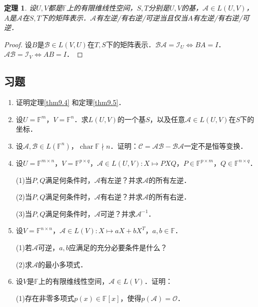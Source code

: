 \documentclass[a4paper,fontset=windows]{ctexbook}
\newtheorem{theorem}{定理}[chapter]
\theoremstyle{definition}
\DeclareMathOperator{\Char}{char}
\begin{document}
\begin{theorem}
设$U,V$都是$\mathbb{F}$上的有限维线性空间，$S,T$分别是$U,V$的基，$\mathcal{A}\in L(U,V)$，$A$是$\mathcal{A}$在$S,T$下的矩阵表示．$\mathcal{A}$有左逆/有右逆/可逆当且仅当$A$有左逆/有右逆/可逆．
\end{theorem}

\begin{proof}
设$B$是$\mathcal{B}\in L(V,U)$在$T,S$下的矩阵表示．$\mathcal{BA}=\mathcal{I}_U\Leftrightarrow BA=I$．$\mathcal{AB}=\mathcal{I}_V\Leftrightarrow AB=I$．
\end{proof}

\subsection*{习题}

\begin{enumerate}
\item 证明定理\ref{thm9.4} 和定理\ref{thm9.5}．

\item 设$U=\mathbb{F}^m$，$V=\mathbb{F}^n$．求$L(U,V)$的一个基$S$，以及任意$\mathcal{A}\in L(U,V)$在$S$下的坐标．

\item 设$\mathcal{A,B}\in L(\mathbb{F}^n)$，$\Char\mathbb{F}\nmid n$．证明：$\mathcal{C=AB-BA}$一定不是恒等变换．

\item 设$U=\mathbb{F}^{m\times n}$，$V=\mathbb{F}^{p\times q}$，$\mathcal{A}\in L(U,V):X\mapsto PXQ$，$P\in\mathbb{F}^{p\times m}$，$Q\in\mathbb{F}^{n\times q}$．

(1)当$P,Q$满足何条件时，$\mathcal{A}$有左逆？并求$\mathcal{A}$的所有左逆．

(2)当$P,Q$满足何条件时，$\mathcal{A}$有右逆？并求$\mathcal{A}$的所有右逆．

(3)当$P,Q$满足何条件时，$\mathcal{A}$可逆？并求$\mathcal{A}^{-1}$．

\item 设$V=\mathbb{F}^{n\times n}$，$\mathcal{A}\in L(V):X\mapsto aX+bX^T$，$a,b\in\mathbb{F}$．

(1)若$\mathcal{A}$可逆，$a,b$应满足的充分必要条件是什么？

(2)求$\mathcal{A}$的最小多项式．

\item 设$V$是$\mathbb{F}$上的有限维线性空间，$\mathcal{A}\in L(V)$．证明：

(1)存在非零多项式$p(x)\in\mathbb{F}[x]$，使得$p(\mathcal{A})=\mathcal{O}$．


\end{enumerate}
\end{document}
